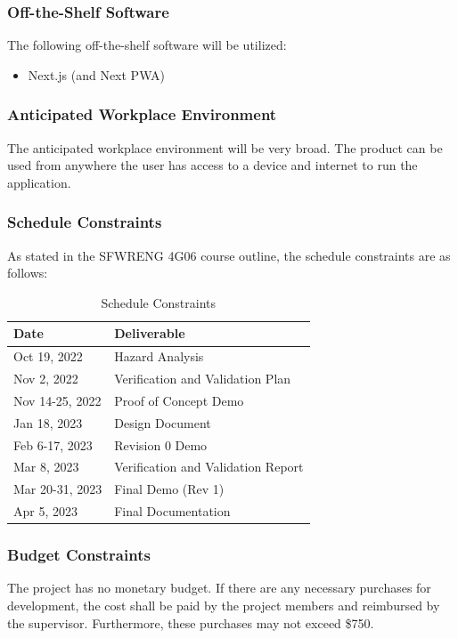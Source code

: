 \documentclass[12pt]{article}
\begin{document}
\subsubsection{Off-the-Shelf Software}
The following off-the-shelf software will be utilized:
\begin{itemize}
	\item Next.js (and Next PWA)
\end{itemize}

\subsubsection{Anticipated Workplace Environment}
The anticipated workplace environment will be very broad. The product can be used from anywhere the
user has access to a device and internet to run the application.

\subsubsection{Schedule Constraints}
As stated in the SFWRENG 4G06 course outline, the schedule constraints are as follows:
\begin{table}[H]
	\centering
	\caption{Schedule Constraints}
	\vspace{5pt}
	\begin{tabular}{|p{}|p{}|}
		\hline
		\textbf{Date}   & \textbf{Deliverable}               \\
		\hline
		Oct 19, 2022    & Hazard Analysis                    \\
		\hline
		Nov 2, 2022     & Verification and Validation Plan   \\
		\hline
		Nov 14-25, 2022 & Proof of Concept Demo              \\
		\hline
		Jan 18, 2023    & Design Document                    \\
		\hline
		Feb 6-17, 2023  & Revision 0 Demo                    \\
		\hline
		Mar 8, 2023     & Verification and Validation Report \\
		\hline
		Mar 20-31, 2023 & Final Demo (Rev 1)                 \\
		\hline
		Apr 5, 2023     & Final Documentation                \\
		\hline
	\end{tabular}
\end{table}

\subsubsection{Budget Constraints}
The project has no monetary budget. If there are any necessary purchases for development, the cost
shall be paid by the project members and reimbursed by the supervisor. Furthermore, these purchases
may not exceed \$750.
\end{document}
